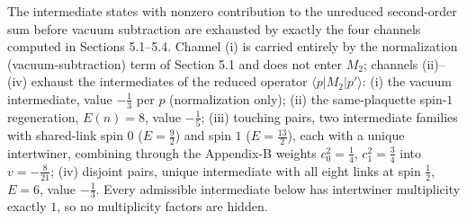 \begin{proposition}\label{prop:exhaust}
The intermediate states with nonzero contribution to the unreduced
second-order sum before vacuum subtraction are exhausted by exactly the
four channels computed in Sections 5.1--5.4. Channel (i) is carried
entirely by the normalization (vacuum-subtraction) term of Section 5.1
and does not enter $M_2$; channels (ii)--(iv) exhaust the intermediates
of the reduced operator $\langle p|M_2|p'\rangle$:
\textup{(i)} the vacuum intermediate, value $-\tfrac13$ per $p$
(normalization only);
\textup{(ii)} the same-plaquette spin-$1$ regeneration, $E(n)=8$, value
$-\tfrac15$;
\textup{(iii)} touching pairs, two intermediate families with shared-link
spin $0$ ($E=\tfrac92$) and spin $1$ ($E=\tfrac{13}{2}$), each with a
unique intertwiner, combining through the Appendix-B weights
$c_0^2=\tfrac14$, $c_1^2=\tfrac34$ into $v=-\tfrac8{21}$;
\textup{(iv)} disjoint pairs, unique intermediate with all eight links at
spin $\tfrac12$, $E=6$, value $-\tfrac13$.
Every admissible intermediate below has intertwiner multiplicity exactly
$1$, so no multiplicity factors are hidden.
\end{proposition}
